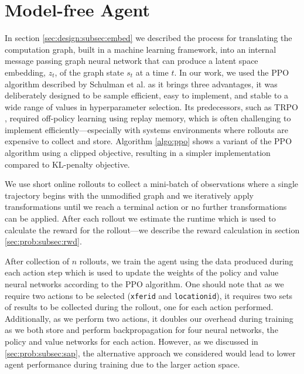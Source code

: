 \section{Model-free Agent}

In section \ref{sec:design:subsec:embed} we described the process for translating the computation graph, built in a machine learning framework, into an internal message passing graph neural network that can produce a latent space embedding, $z_t$, of the graph state $s_t$ at a time $t$. In our work, we used the PPO algorithm  described by Schulman et al. \cite{schulman2017proximal} as it brings three advantages, it was deliberately designed to be sample efficient, easy to implement, and stable to a wide range of values in hyperparameter selection. Its predecessors, such as TRPO \cite{schulman2017trust}, required off-policy learning using replay memory, which is often challenging to implement efficiently---especially with systems environments where rollouts are expensive to collect and store. Algorithm \ref{algo:ppo} shows a variant of the PPO algorithm using a clipped objective, resulting in a simpler implementation compared to KL-penalty objective.





We use short online rollouts to collect a mini-batch of observations where a single trajectory begins with the unmodified graph and we iteratively apply transformations until we reach a terminal action or no further transformations can be applied. After each rollout we estimate the runtime which is used to calculate the reward for the rollout---we describe the reward calculation in section \ref{sec:prob:subsec:rwd}.

After collection of $n$ rollouts, we train the agent using the data produced during each action step which is used to update the weights of the policy and value neural networks according to the PPO algorithm. One should note that as we require two actions to be selected (\texttt{xfer\textunderscore id} and \texttt{location\textunderscore id}), it requires two sets of results to be collected during the rollout, one for each action performed. Additionally, as we perform two actions, it doubles our overhead during training as we both store and perform backpropagation for four neural networks, the policy and value networks for each action. However, as we discussed in \ref{sec:prob:subsec:sap}, the alternative approach we considered would lead to lower agent performance during training due to the larger action space.